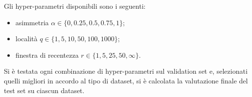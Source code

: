Gli hyper-parametri disponibili sono i seguenti:
\begin{itemize}
    \item asimmetria $\alpha \in \{0, 0.25, 0.5, 0.75, 1\}$;
    \item località $q \in \{1, 5, 10, 50, 100, 1000\}$;
    \item finestra di recentezza $r \in \{1, 5, 25, 50, \infty \}$.
\end{itemize}

Si è testata ogni combinazione di hyper-parametri sul validation set e, selezionati quelli migliori in accordo al tipo di dataset, si è calcolata la valutazione finale del test set su ciascun dataset.